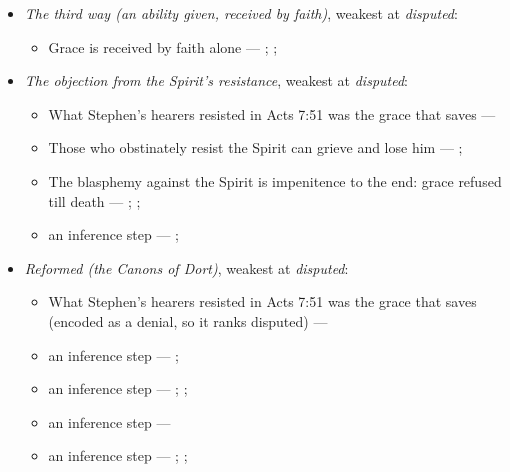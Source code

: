 \documentclass[11pt]{article}
\begin{document}
\begin{itemize}
\begin{itemize}
\end{itemize}
\item \emph{The third way (an ability given, received by faith)}, weakest at \emph{disputed}:
\begin{itemize}
\item Grace is received by faith alone --- \cite[Augsburg Confession IV.1–3]{concordia-triglotta-1921}; \cite[Sermon 1, III.1]{wesley-sermons-1872}; \cite[Trent, Session VI (1547), canon 9]{tanner-decrees-1990}
\end{itemize}
\item \emph{The objection from the Spirit’s resistance}, weakest at \emph{disputed}:
\begin{itemize}
\item What Stephen’s hearers resisted in Acts 7:51 was the grace that saves --- \cite[Five Arminian Articles (1610), art. 4]{schaff-creeds-christendom-3-1977}
\item Those who obstinately resist the Spirit can grieve and lose him --- \cite[Solid Declaration II.83]{concordia-triglotta-1921}; \cite[Solid Declaration XI.42]{concordia-triglotta-1921}
\item The blasphemy against the Spirit is impenitence to the end: grace refused till death --- \cite[325]{npnf1-06-1888}; \cite[II-II q.14 a.1]{aquinas-summa-1920}; \cite[74]{calvin-harmony-evangelists-2-1845}
\item an inference step --- \cite[325]{npnf1-06-1888}; \cite[On Rebuke and Grace, ch. 43]{npnf1-05-1887}
\end{itemize}
\item \emph{Reformed (the Canons of Dort)}, weakest at \emph{disputed}:
\begin{itemize}
\item What Stephen’s hearers resisted in Acts 7:51 was the grace that saves (encoded as a denial, so it ranks disputed) --- \cite[Canons of Dort, III/IV, art. 9]{schaff-creeds-christendom-3-1977}
\item an inference step --- \cite[ad loc. Eph 2:8]{robertson-word-pictures-4-1931}; \cite[228--229]{calvin-galatians-ephesians-1854}
\item an inference step --- \cite[600]{arminius-works-1-1825}; \cite[681]{arminius-works-1-1825}; \cite[Five Arminian Articles (1610), art. 4]{schaff-creeds-christendom-3-1977}
\item an inference step --- \cite[527--565]{arminius-works-3-1853}
\item an inference step --- \cite[Solid Declaration II.89]{concordia-triglotta-1921}; \cite[Solid Declaration II.60]{concordia-triglotta-1921}; \cite[Solid Declaration XI.41]{concordia-triglotta-1921}

\end{itemize}
\end{itemize}
\end{document}

